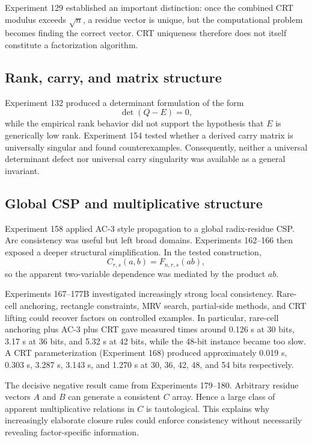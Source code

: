 \documentclass[11pt,a4paper]{article}
\begin{document}
Experiment 129 established an important distinction: once the combined CRT modulus exceeds $\sqrt n$, a residue vector is unique, but the computational problem becomes finding the correct vector. CRT uniqueness therefore does not itself constitute a factorization algorithm.

\subsection{Rank, carry, and matrix structure}

Experiment 132 produced a determinant formulation of the form
\[
\det(Q-E)=0,
\]
while the empirical rank behavior did not support the hypothesis that $E$ is generically low rank. Experiment 154 tested whether a derived carry matrix is universally singular and found counterexamples. Consequently, neither a universal determinant defect nor universal carry singularity was available as a general invariant.

\subsection{Global CSP and multiplicative structure}

Experiment 158 applied AC-3 style propagation to a global radix-residue CSP. Arc consistency was useful but left broad domains. Experiments 162--166 then exposed a deeper structural simplification. In the tested construction,
\begin{equation}
 C_{r,s}(a,b)=F_{n,r,s}(ab),
\end{equation}
so the apparent two-variable dependence was mediated by the product $ab$.

Experiments 167--177B investigated increasingly strong local consistency. Rare-cell anchoring, rectangle constraints, MRV search, partial-side methods, and CRT lifting could recover factors on controlled examples. In particular, rare-cell anchoring plus AC-3 plus CRT gave measured times around 0.126 s at 30 bits, 3.17 s at 36 bits, and 5.32 s at 42 bits, while the 48-bit instance became too slow. A CRT parameterization (Experiment 168) produced approximately 0.019 s, 0.303 s, 3.287 s, 3.143 s, and 1.270 s at 30, 36, 42, 48, and 54 bits respectively.

The decisive negative result came from Experiments 179--180. Arbitrary residue vectors $A$ and $B$ can generate a consistent $C$ array. Hence a large class of apparent multiplicative relations in $C$ is tautological. This explains why increasingly elaborate closure rules could enforce consistency without necessarily revealing factor-specific information.
\end{document}
